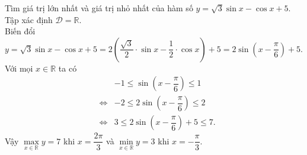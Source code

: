 \begin{ex}%
	Tìm giá trị lớn nhất và giá trị nhỏ nhất của hàm số $y=\sqrt{3} \sin x-\cos x+5$.
	\loigiai
	{
		Tập xác định $\mathscr{D}=\mathbb{R}$.\\
		Biến đổi $y=\sqrt{3} \sin x-\cos x+5=2\left(\dfrac{\sqrt{3}}{2}\cdot\sin x-\dfrac{1}{2}\cdot\cos x\right)+5=2\sin\left(x-\dfrac{\pi}{6}\right)+5$.\\
		Với mọi $x\in \mathbb{R}$ ta có
		\allowdisplaybreaks
		\begin{eqnarray*}
			& & -1\leq \sin\left(x-\dfrac{\pi}{6}\right)\leq 1\\
			&\Leftrightarrow& -2\leq 2\sin\left(x-\dfrac{\pi}{6}\right)\leq 2\\
			&\Leftrightarrow&3\leq  2\sin\left(x-\dfrac{\pi}{6}\right)+5\leq 7.
		\end{eqnarray*}
		Vậy $\max\limits_{x \in \mathbb{R}} y=7$ khi $x=\dfrac{2\pi}{3}$ và $\min\limits_{x \in \mathbb{R}} y=3$ khi $x=-\dfrac{\pi}{3}$.
	}
\end{ex}

